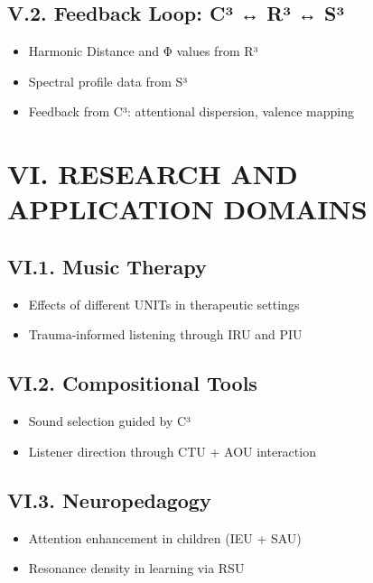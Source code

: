 \documentclass[10pt]{article}
\begin{document}
\subsection*{V.2. Feedback Loop: C³ ↔ R³ ↔ S³}

\begin{itemize}
    \item Harmonic Distance and Φ values from R³
    \item Spectral profile data from S³
    \item Feedback from C³: attentional dispersion, valence mapping
\end{itemize}

\section*{VI. RESEARCH AND APPLICATION DOMAINS}

\subsection*{VI.1. Music Therapy}

\begin{itemize}
    \item Effects of different UNITs in therapeutic settings
    \item Trauma-informed listening through IRU and PIU
\end{itemize}

\subsection*{VI.2. Compositional Tools}

\begin{itemize}
    \item Sound selection guided by C³
    \item Listener direction through CTU + AOU interaction
\end{itemize}

\subsection*{VI.3. Neuropedagogy}

\begin{itemize}
    \item Attention enhancement in children (IEU + SAU)
    \item Resonance density in learning via RSU
\end{itemize}
\end{document}

